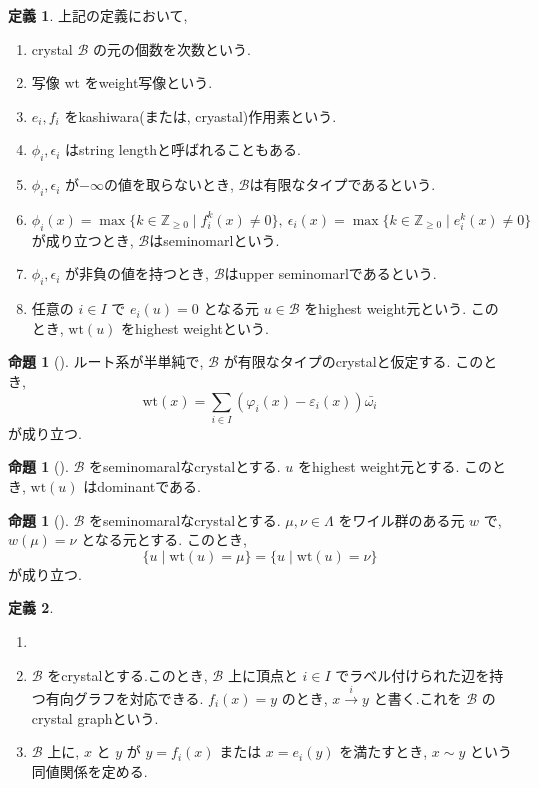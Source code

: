 \documentclass[
  a4paper, 
  12pt,
  ja=standard,
  xelatex,
  left=30truemm,
  right=30truemm,
  titlepage 
]{bxjsarticle}
\theoremstyle{definition}
\newtheorem{df}{定義}
\newtheorem{prop}[thm]{命題}
\begin{document}
\begin{df} 上記の定義において,
  \begin{enumerate}
    \item crystal $\mathscr{B}$ の元の個数を次数という.
    \item 写像 $\mathrm{wt}$ をweight写像という.
    \item $e_i, f_i$ をkashiwara(または, cryastal)作用素という.
    \item $\phi_i, \epsilon_i$ はstring lengthと呼ばれることもある.
    \item $\phi_i, \epsilon_i$ が$- \infty $の値を取らないとき, $\mathscr{B}$は有限なタイプであるという.
    \item $\phi_i(x) = \max\{ k \in \mathbb{Z}_{\geq 0} \mid f_i^k(x) \neq 0 \}, \ \epsilon_i(x) = \max\{ k \in \mathbb{Z}_{\geq 0} \mid e_i^k(x) \neq 0 \}$ \\
    が成り立つとき, $\mathscr{B}$はseminomarlという.
    \item $\phi_i, \epsilon_i$ が非負の値を持つとき, $\mathscr{B}$はupper seminomarlであるという.
    \item 任意の $i \in I$ で $e_i(u) = 0$ となる元 $u \in \mathscr{B}$ をhighest weight元という. このとき, $\mathrm{wt}(u)$ をhighest weightという.
  \end{enumerate}
\end{df}

\begin{prop}[{\cite[補題2.14]{b1}}] 
  ルート系が半単純で, $\mathscr{B}$ が有限なタイプのcrystalと仮定する. このとき,
  $$ \mathrm{wt}(x) = \sum_{ i \in I} (\varphi_i(x) - \varepsilon_i(x))\bar{\omega_i}$$
  が成り立つ.
\end{prop}

\begin{prop}[{\cite[命題2.16]{b1}}] 
  $\mathscr{B}$ をseminomaralなcrystalとする. $u$ をhighest weight元とする. このとき, $\mathrm{wt}(u)$ はdominantである.
\end{prop}

\begin{prop}[{\cite[命題2.17]{b1}}] 
  $\mathscr{B}$ をseminomaralなcrystalとする. $\mu, \nu \in \Lambda$ をワイル群のある元 $w$ で, $w(\mu) = \nu$ となる元とする.
  このとき,  
  \[
  \{ u \mid \mathrm{wt}(u) = \mu \} = \{ u \mid \mathrm{wt}(u) = \nu \}
  \]
  が成り立つ.
\end{prop}

\begin{df}
  \begin{enumerate}
    \item []
    \item $\mathscr{B}$ をcrystalとする.このとき, $\mathscr{B}$ 上に頂点と $i \in I$ でラベル付けられた辺を持つ有向グラフを対応できる. 
    $f_i(x) = y$ のとき, $ x \xrightarrow{i} y$ と書く.これを $\mathscr{B}$ のcrystal graphという.
    \item $\mathscr{B}$ 上に, $x$ と $y$ が $y = f_i(x)$ または $x = e_i(y)$ を満たすとき, $x \sim y$ という同値関係を定める.
  \end{enumerate}
\end{df}
\end{document}
